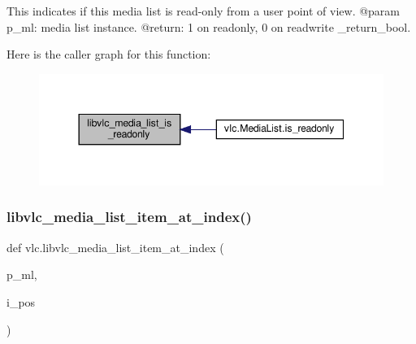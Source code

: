 \begin{DoxyVerb}This indicates if this media list is read-only from a user point of view.
@param p_ml: media list instance.
@return: 1 on readonly, 0 on readwrite \libvlc_return_bool.
\end{DoxyVerb}
 Here is the caller graph for this function\+:
\nopagebreak
\begin{figure}[H]
\begin{center}
\leavevmode
\includegraphics[width=344pt]{namespacevlc_a3ce52be946efb72c7364aaf27e35d43d_icgraph}
\end{center}
\end{figure}
\mbox{\label{namespacevlc_a80caa9f399a4da1b6c5fd68173fc867b}} 
\subsubsection{\texorpdfstring{libvlc\+\_\+media\+\_\+list\+\_\+item\+\_\+at\+\_\+index()}{libvlc\_media\_list\_item\_at\_index()}}
{\footnotesize\ttfamily def vlc.\+libvlc\+\_\+media\+\_\+list\+\_\+item\+\_\+at\+\_\+index (\begin{DoxyParamCaption}\item[{}]{p\+\_\+ml,  }\item[{}]{i\+\_\+pos }\end{DoxyParamCaption})}

